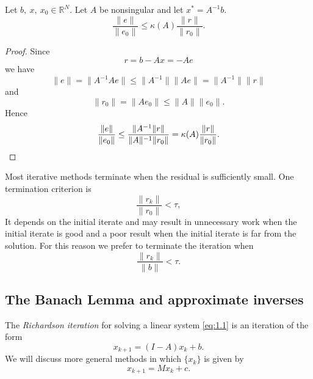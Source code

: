 \begin{lemma}
  Let $b,\ x,\ x_0\in\mathbb{R}^N$. Let $A$ be nonsingular and let
  $x^*=A^{-1}b$.
  \begin{equation}
    \label{eq:1.3}
    \frac{\|e\|}{\|e_0\|}\leq\kappa(A)\frac{\|r\|}{\|r_0\|}.
  \end{equation}
\end{lemma}

\begin{proof}
  Since $$r=b-Ax=-Ae$$ we
  have $$\|e\|=\|A^{-1}Ae\|\leq\|A^{-1}\|\|Ae\|=\|A^{-1}\|\|r\|$$
  and $$\|r_0\|=\|Ae_0\|\leq\|A\|\|e_0\|.$$
  Hence
  \begin{equation*}
    \frac{\|e\|}{\|e_0\|}\leq
  \frac{\|A^{-1}\|r\|}{\|A\|^{-1}\|r_0\|}
  =\kappa(A)\frac{\|r\|}{\|r_0\|}.\qedhere
  \end{equation*}
\end{proof}

\begin{rmk}
  Most iterative methods terminate when the residual is sufficiently
  small. One termination criterion is
  \begin{equation}
    \label{eq:1.2}
    \frac{\|r_k\|}{\|r_0\|}< \tau,
  \end{equation}
  It depends on the initial iterate and may result in unnecessary work
  when the initial iterate is good and a poor result when the initial
  iterate is far from the solution. For this reason we prefer to
  terminate the iteration when
  \begin{equation}
    \label{eq:1.4}
    \frac{\|r_k\|}{\|b\|}<\tau.
  \end{equation}
\end{rmk}

\subsection{The Banach Lemma and approximate inverses}
\label{sec:1.1.2}

\begin{defi}
  The \emph{Richardson iteration} for solving a linear system
  \eqref{eq:1.1} is an iteration of the form
  \begin{equation}
    \label{eq:1.6}
    x_{k+1} = (I-A)x_k + b.
  \end{equation}
  We will discuss more general methods in which $\{x_k\}$ is given by
  \begin{equation}
    \label{eq:1.7}
    x_{k+1}=Mx_k + c.
  \end{equation}
\end{defi}

